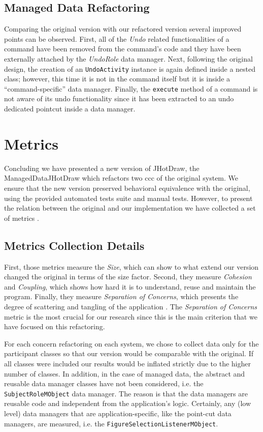 \subsection{Managed Data Refactoring}
Comparing the original version with our refactored version several improved points can be observed.
First, all of the \textit{Undo} related functionalities of a command have been removed from the command's code and they have been externally attached by the \textit{UndoRole} data manager.
Next, following the original design, the creation of an \texttt{UndoActivity} instance is again defined inside a nested class; however, this time it is not in the command itself but it is inside a ``command-specific'' data manager.
Finally, the \texttt{execute} method of a command is not aware of its undo functionality since it has been extracted to an undo dedicated pointcut inside a data manager.

\section{Metrics}\label{Evaluation Metrics}
Concluding we have presented a new version of JHotDraw, the ManagedDataJHotDraw which refactors two \ac{ccc} of the original system.
We ensure that the new version preserved behavioral equivalence with the original, using the provided automated tests suite and manual tests.
However, to present the relation between the original and our implementation we have collected a set of metrics \cite{sant2003reuse}.

\subsection{Metrics Collection Details}\label{Metrics Collection Details}
First, those metrics measure the \textit{Size}, which can show to what extend our version changed the original in terms of the size factor.
Second, they measure \textit{Cohesion} and \textit{Coupling}, which shows how hard it is to understand, reuse and maintain the program.
Finally, they measure \textit{Separation of Concerns}, which presents the degree of scattering and tangling of the application .
The \textit{Separation of Concerns} metric is the most crucial for our research since this is the main criterion that we have focused on this refactoring.

For each concern refactoring on each system, we chose to collect data only for the participant classes so that our version would be comparable with the original.
If all classes were included our results would be inflated strictly due to the higher number of classes.
In addition, in the case of managed data, the abstract and reusable data manager classes have not been considered, i.e. the \texttt{SubjectRoleMObject} data manager.
The reason is that the data managers are reusable code and independent from the application's logic.
Certainly, any (low level) data managers that are application-specific, like the point-cut data managers, are measured, i.e. the \texttt{FigureSelectionListenerMObject}.

